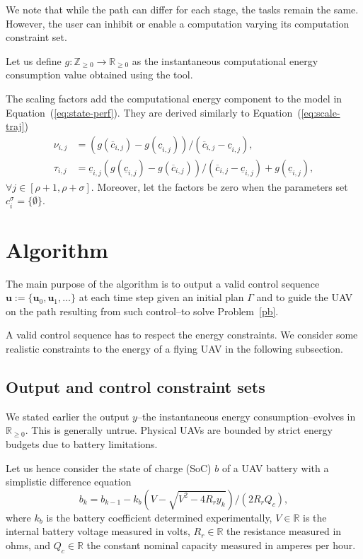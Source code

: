 \documentclass[letterpaper,10pt,conference]{ieeeconf}
\theoremstyle{definition}
\begin{document}
We note that while the path can differ for each stage, the tasks remain the same. However, the user can inhibit or enable a computation varying its computation constraint set.

Let us define $g:\mathbb{Z}_{\geq 0}\rightarrow\mathbb{R}_{\geq 0}$ as the instantaneous computational energy consumption value obtained using the tool.

The scaling factors add the computational energy component to the model in Equation~(\ref{eq:state-perf}). They are derived similarly to Equation~(\ref{eq:scale-traj})
\begin{equation*}\begin{split}
  \nu_{i,j}&=(g(\overline{c}_{i,j})-g(\underline{c}_{i,j}))/(\overline{c}_{i,j}-\underline{c}_{i,j}),\\
  \tau_{i,j}&=\underline{c}_{i,j}(g(\underline{c}_{i,j})-g(\overline{c}_{i,j}))/(\overline{c}_{i,j}-\underline{c}_{i,j})+g(\underline{c}_{i,j}),
\end{split}\end{equation*}
$\forall j\in[\rho+1,\rho+\sigma]$. Moreover, let the factors be zero when the parameters set $c_i^\sigma=\{\emptyset\}$.



\section{Algorithm}  %
\label{sec:algo}     %
The main purpose of the algorithm is to output a valid control sequence $\mathbf{u}:=\{\mathbf{u}_0,\mathbf{u}_1,\dots\}$ at each time step given an initial plan $\Gamma$ and to guide the UAV on the path resulting from such control--to solve Problem~\ref{pb}.

A valid control sequence has to respect the energy constraints. We consider some realistic constraints to the energy of a flying UAV in the following subsection.

\subsection{Output and control constraint sets}

We stated earlier the output $y$--the instantaneous energy consumption--evolves in $\mathbb{R}_{\geq 0}$. This is generally untrue. Physical UAVs are bounded by strict energy budgets due to battery limitations.

Let us hence consider the state of charge (SoC) $b$ of a UAV battery with a simplistic difference equation~\cite{seewald2020mechanical}
\begin{equation}\label{eq:bat}
  b_k=b_{k-1}-k_b\left(V-
  \sqrt{
    V^2-
    4R_ry_k}
  \right)/(2R_rQ_c),
\end{equation}
where $k_b$ is the battery coefficient determined experimentally,  $V\in\mathbb{R}$ is the internal battery 
voltage measured in volts, $R_r\in\mathbb{R}$ the resistance measured in ohms, and $Q_c\in\mathbb{R}$ the constant nominal capacity measured in amperes per hour. 
\end{document}
